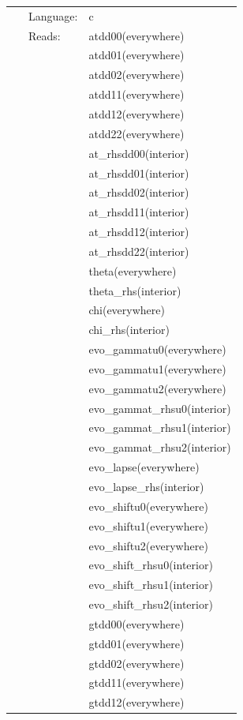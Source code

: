  \begin{tabular*}{160mm}{cll} 
~ & Language:  & c \\ 
~ & Reads:  & atdd00(everywhere) \\ 
~& ~ &atdd01(everywhere)\\ 
~& ~ &atdd02(everywhere)\\ 
~& ~ &atdd11(everywhere)\\ 
~& ~ &atdd12(everywhere)\\ 
~& ~ &atdd22(everywhere)\\ 
~& ~ &at\_rhsdd00(interior)\\ 
~& ~ &at\_rhsdd01(interior)\\ 
~& ~ &at\_rhsdd02(interior)\\ 
~& ~ &at\_rhsdd11(interior)\\ 
~& ~ &at\_rhsdd12(interior)\\ 
~& ~ &at\_rhsdd22(interior)\\ 
~& ~ &theta(everywhere)\\ 
~& ~ &theta\_rhs(interior)\\ 
~& ~ &chi(everywhere)\\ 
~& ~ &chi\_rhs(interior)\\ 
~& ~ &evo\_gammatu0(everywhere)\\ 
~& ~ &evo\_gammatu1(everywhere)\\ 
~& ~ &evo\_gammatu2(everywhere)\\ 
~& ~ &evo\_gammat\_rhsu0(interior)\\ 
~& ~ &evo\_gammat\_rhsu1(interior)\\ 
~& ~ &evo\_gammat\_rhsu2(interior)\\ 
~& ~ &evo\_lapse(everywhere)\\ 
~& ~ &evo\_lapse\_rhs(interior)\\ 
~& ~ &evo\_shiftu0(everywhere)\\ 
~& ~ &evo\_shiftu1(everywhere)\\ 
~& ~ &evo\_shiftu2(everywhere)\\ 
~& ~ &evo\_shift\_rhsu0(interior)\\ 
~& ~ &evo\_shift\_rhsu1(interior)\\ 
~& ~ &evo\_shift\_rhsu2(interior)\\ 
~& ~ &gtdd00(everywhere)\\ 
~& ~ &gtdd01(everywhere)\\ 
~& ~ &gtdd02(everywhere)\\ 
~& ~ &gtdd11(everywhere)\\ 
~& ~ &gtdd12(everywhere)\\ 

\end{tabular*}
